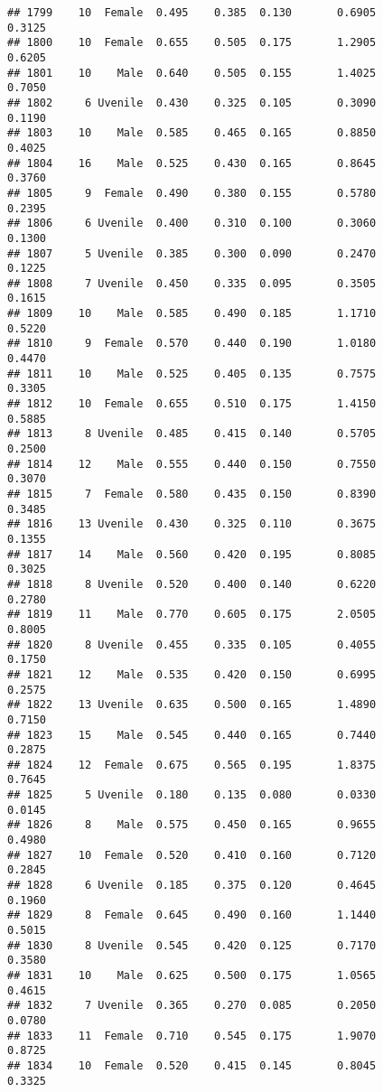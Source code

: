 \documentclass[
]{article}
\begin{document}
\begin{verbatim}
## 1799    10  Female  0.495    0.385  0.130       0.6905         0.3125
## 1800    10  Female  0.655    0.505  0.175       1.2905         0.6205
## 1801    10    Male  0.640    0.505  0.155       1.4025         0.7050
## 1802     6 Uvenile  0.430    0.325  0.105       0.3090         0.1190
## 1803    10    Male  0.585    0.465  0.165       0.8850         0.4025
## 1804    16    Male  0.525    0.430  0.165       0.8645         0.3760
## 1805     9  Female  0.490    0.380  0.155       0.5780         0.2395
## 1806     6 Uvenile  0.400    0.310  0.100       0.3060         0.1300
## 1807     5 Uvenile  0.385    0.300  0.090       0.2470         0.1225
## 1808     7 Uvenile  0.450    0.335  0.095       0.3505         0.1615
## 1809    10    Male  0.585    0.490  0.185       1.1710         0.5220
## 1810     9  Female  0.570    0.440  0.190       1.0180         0.4470
## 1811    10    Male  0.525    0.405  0.135       0.7575         0.3305
## 1812    10  Female  0.655    0.510  0.175       1.4150         0.5885
## 1813     8 Uvenile  0.485    0.415  0.140       0.5705         0.2500
## 1814    12    Male  0.555    0.440  0.150       0.7550         0.3070
## 1815     7  Female  0.580    0.435  0.150       0.8390         0.3485
## 1816    13 Uvenile  0.430    0.325  0.110       0.3675         0.1355
## 1817    14    Male  0.560    0.420  0.195       0.8085         0.3025
## 1818     8 Uvenile  0.520    0.400  0.140       0.6220         0.2780
## 1819    11    Male  0.770    0.605  0.175       2.0505         0.8005
## 1820     8 Uvenile  0.455    0.335  0.105       0.4055         0.1750
## 1821    12    Male  0.535    0.420  0.150       0.6995         0.2575
## 1822    13 Uvenile  0.635    0.500  0.165       1.4890         0.7150
## 1823    15    Male  0.545    0.440  0.165       0.7440         0.2875
## 1824    12  Female  0.675    0.565  0.195       1.8375         0.7645
## 1825     5 Uvenile  0.180    0.135  0.080       0.0330         0.0145
## 1826     8    Male  0.575    0.450  0.165       0.9655         0.4980
## 1827    10  Female  0.520    0.410  0.160       0.7120         0.2845
## 1828     6 Uvenile  0.185    0.375  0.120       0.4645         0.1960
## 1829     8  Female  0.645    0.490  0.160       1.1440         0.5015
## 1830     8 Uvenile  0.545    0.420  0.125       0.7170         0.3580
## 1831    10    Male  0.625    0.500  0.175       1.0565         0.4615
## 1832     7 Uvenile  0.365    0.270  0.085       0.2050         0.0780
## 1833    11  Female  0.710    0.545  0.175       1.9070         0.8725
## 1834    10  Female  0.520    0.415  0.145       0.8045         0.3325

\end{verbatim}
\end{document}
